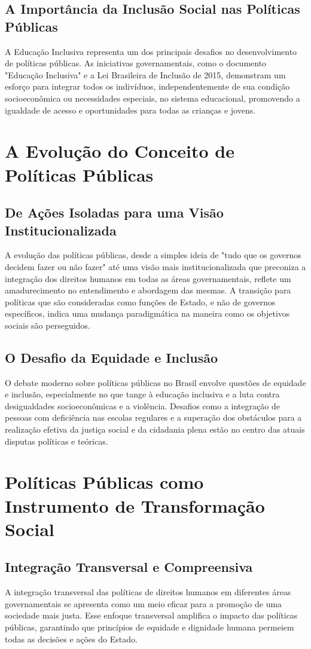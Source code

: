 \documentclass[
   article,       
   12pt,          
   oneside,       
   a4paper,       
   english,       
   brazil,        
   sumario=tradicional
   ]{abntex2}
\begin{document}
\subsection{A Importância da Inclusão Social nas Políticas Públicas}
A Educação Inclusiva representa um dos principais desafios no desenvolvimento de políticas públicas. As iniciativas governamentais, como o documento "Educação Inclusiva" e a Lei Brasileira de Inclusão de 2015, demonstram um esforço para integrar todos os indivíduos, independentemente de sua condição socioeconômica ou necessidades especiais, no sistema educacional, promovendo a igualdade de acesso e oportunidades para todas as crianças e jovens.

\section{A Evolução do Conceito de Políticas Públicas}
\subsection{De Ações Isoladas para uma Visão Institucionalizada}
A evolução das políticas públicas, desde a simples ideia de "tudo que os governos decidem fazer ou não fazer" até uma visão mais institucionalizada que preconiza a integração dos direitos humanos em todas as áreas governamentais, reflete um amadurecimento no entendimento e abordagem das mesmas. A transição para políticas que são consideradas como funções de Estado, e não de governos específicos, indica uma mudança paradigmática na maneira como os objetivos sociais são perseguidos.

\subsection{O Desafio da Equidade e Inclusão}
O debate moderno sobre políticas públicas no Brasil envolve questões de equidade e inclusão, especialmente no que tange à educação inclusiva e a luta contra desigualdades socioeconômicas e a violência. Desafios como a integração de pessoas com deficiência nas escolas regulares e a superação dos obstáculos para a realização efetiva da justiça social e da cidadania plena estão no centro das atuais disputas políticas e teóricas.

\section{Políticas Públicas como Instrumento de Transformação Social}
\subsection{Integração Transversal e Compreensiva}
A integração transversal das políticas de direitos humanos em diferentes áreas governamentais se apresenta como um meio eficaz para a promoção de uma sociedade mais justa. Esse enfoque transversal amplifica o impacto das políticas públicas, garantindo que princípios de equidade e dignidade humana permeiem todas as decisões e ações do Estado.
\end{document}
